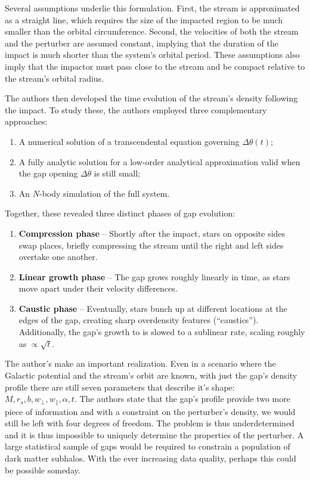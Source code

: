             Several assumptions underlie this formulation. First, the stream is approximated as a straight line, which requires the size of the impacted region to be much smaller than the orbital circumference. Second, the velocities of both the stream and the perturber are assumed constant, implying that the duration of the impact is much shorter than the system's orbital period. These assumptions also imply that the impactor must pass close to the stream and be compact relative to the stream's orbital radius.

            The authors then developed the time evolution of the stream's density following the impact. To study these, the authors employed three complementary approaches:
            \begin{enumerate}
                \item A numerical solution of a transcendental equation governing $\Delta \theta(t)$;
                \item A fully analytic solution for a low-order analytical approximation valid when the gap opening $\Delta \theta$ is still small;
                \item An $N$-body simulation of the full system.
            \end{enumerate}

            Together, these revealed three distinct phases of gap evolution:
            \begin{enumerate}
                \item \textbf{Compression phase} --  Shortly after the impact, stars on opposite sides swap places, briefly compressing the stream until the right and left sides overtake one another. 
                \item \textbf{Linear growth phase} -- The gap grows roughly linearly in time, as stars move apart under their velocity differences.
                \item \textbf{Caustic phase} -- Eventually, stars bunch up at different locations at the edges of the gap, creating sharp overdensity features (``caustics''). Additionally, the gap's growth to is slowed to a sublinear rate, scaling roughly as $\propto \sqrt{t}$.
            \end{enumerate}


            The author's make an important realization. Even in a scenario where the Galactic potential and the stream's orbit are known, with just the gap's density profile there are still seven parameters that describe it's shape: $M,r_s,b,w_\perp,w_\parallel,\alpha,t$. The authors state that the gap's profile provide two more piece of information and with a constraint on the perturber's density, we would still be left with four degrees of freedom. The problem is thus underdetermined and it is thus impossible to uniquely determine the properties of the perturber. A large statistical sample of gaps would be required to constrain a population of dark matter subhalos. With the ever increasing data quality, perhaps this could be possible someday.  

